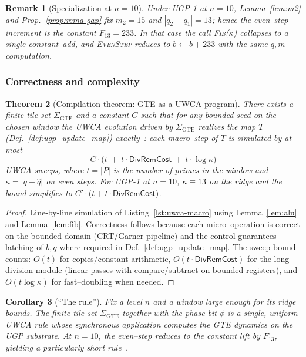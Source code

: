\documentclass[12pt]{article}
\newtheorem{theorem}{Theorem}[section]
\newtheorem{corollary}[theorem]{Corollary}
\newtheorem{remark}[theorem]{Remark}
\numberwithin{equation}{section}
\begin{document}
\begin{remark}[Specialization at \(n=10\)]
Under UGP-1 at \(n{=}10\), Lemma~\ref{lem:m2} and Prop.~\ref{prop:rema-gap} fix \(m_2{=}15\) and \(|q_2{-}q_1|{=}13\); hence the even–step increment is the constant \(F_{13}{=}233\). In that case the call \textsc{Fib}(\(\kappa\)) collapses to a single constant–add, and \textsc{EvenStep} reduces to \(b\leftarrow b+233\) with the same \(q,m\) computation.
\end{remark}

\subsubsection{Correctness and complexity}\label{subsec:gte-correct}
\begin{theorem}[Compilation theorem: GTE as a UWCA program]\label{thm:gte-as-uwca}
There exists a finite tile set \(\Sigma_{\mathrm{GTE}}\) and a constant \(C\) such that for any bounded seed on the chosen window the UWCA evolution driven by \(\Sigma_{\mathrm{GTE}}\) realizes the map \(T\) (Def.~\ref{def:ugp_update_map}) exactly~\cite{SpivackUGPFormalization,ugp-lean}: each \emph{macro–step} of \(T\) is simulated by at most
\[
C\cdot \big( t\ +\ t\cdot \textsf{DivRemCost}\ +\ t\cdot \log \kappa \big)
\]
UWCA sweeps, where \(t=|P|\) is the number of primes in the window and \(\kappa=|q-\hat q|\) on even steps. For UGP-1 at \(n{=}10\), \(\kappa\equiv 13\) on the ridge and the bound simplifies to \(C'\cdot \big(t+t\cdot \textsf{DivRemCost}\big)\).
\end{theorem}

\begin{proof}
Line-by-line simulation of Listing~\ref{lst:uwca-macro} using Lemma~\ref{lem:alu} and Lemma~\ref{lem:fib}. Correctness follows because each micro–operation is correct on the bounded domain (CRT/Garner pipeline) and the control guarantees latching of \(b,q\) where required in Def.~\ref{def:ugp_update_map}. The sweep bound counts: \(O(t)\) for copies/constant arithmetic, \(O(t\cdot \textsf{DivRemCost})\) for the long division module (linear passes with compare/subtract on bounded registers), and \(O(t\log \kappa)\) for fast–doubling when needed.
\end{proof}

\begin{corollary}[``The rule'']\label{cor:the-rule}
Fix a level \(n\) and a window large enough for its ridge bounds. The finite tile set \(\Sigma_{\mathrm{GTE}}\) together with the phase bit \(\phi\) is a \emph{single, uniform UWCA rule} whose synchronous application computes the GTE dynamics on the UGP substrate. At \(n{=}10\), the even–step reduces to the constant lift by \(F_{13}\), yielding a particularly short rule~\cite{SpivackUGPFormalization,ugp-lean}.
\end{corollary}
\end{document}
